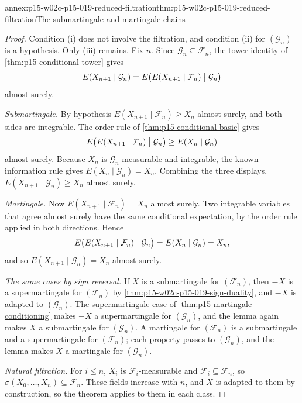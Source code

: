 \begin{annexitem}{annex:p15-w02c-p15-019-reduced-filtration}{thm:p15-w02c-p15-019-reduced-filtration}{The submartingale and martingale chains}
\begin{proof}
Condition (i) does not involve the filtration, and condition (ii) for
\((\mathcal G_n)\) is a hypothesis. Only (iii) remains. Fix \(n\).
Since \(\mathcal G_n\subseteq\mathcal F_n\), the tower identity of
\cref{thm:p15-conditional-tower} gives
\[
 E(X_{n+1}\mid\mathcal G_n)
     =E\bigl(E(X_{n+1}\mid\mathcal F_n)\bigm|\mathcal G_n\bigr)
\]
almost surely.

\emph{Submartingale.} By hypothesis
\(E(X_{n+1}\mid\mathcal F_n)\geq X_n\) almost surely, and both sides are
integrable. The order rule of \cref{thm:p15-conditional-basic} gives
\[
 E\bigl(E(X_{n+1}\mid\mathcal F_n)\bigm|\mathcal G_n\bigr)
       \geq E(X_n\mid\mathcal G_n)
\]
almost surely. Because \(X_n\) is \(\mathcal G_n\)-measurable and
integrable, the known-information rule gives
\(E(X_n\mid\mathcal G_n)=X_n\). Combining the three displays,
\(E(X_{n+1}\mid\mathcal G_n)\geq X_n\) almost surely.

\emph{Martingale.} Now \(E(X_{n+1}\mid\mathcal F_n)=X_n\) almost surely.
Two integrable variables that agree almost surely have the same
conditional expectation, by the order rule applied in both directions.
Hence
\[
 E\bigl(E(X_{n+1}\mid\mathcal F_n)\bigm|\mathcal G_n\bigr)
       =E(X_n\mid\mathcal G_n)=X_n ,
\]
and so \(E(X_{n+1}\mid\mathcal G_n)=X_n\) almost surely.

\emph{The same cases by sign reversal.} If \(X\) is a submartingale for
\((\mathcal F_n)\), then \(-X\) is a supermartingale for
\((\mathcal F_n)\) by \cref{thm:p15-w02c-p15-019-sign-duality}, and
\(-X\) is adapted to \((\mathcal G_n)\). The supermartingale case of
\cref{thm:p15-martingale-conditioning} makes \(-X\) a supermartingale
for \((\mathcal G_n)\), and the lemma again makes \(X\) a submartingale
for \((\mathcal G_n)\). A martingale for \((\mathcal F_n)\) is a
submartingale and a supermartingale for \((\mathcal F_n)\); each property
passes to \((\mathcal G_n)\), and the lemma makes \(X\) a martingale
for \((\mathcal G_n)\).

\emph{Natural filtration.} For \(i\leq n\), \(X_i\) is
\(\mathcal F_i\)-measurable and \(\mathcal F_i\subseteq\mathcal F_n\), so
\(\sigma(X_0,\ldots,X_n)\subseteq\mathcal F_n\). These fields increase
with \(n\), and \(X\) is adapted to them by construction, so the
theorem applies to them in each class.
\end{proof}
\end{annexitem}

